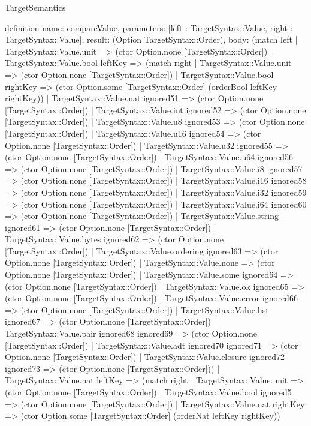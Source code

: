 \begin{lexlean}{TargetSemantics}
\begin{semanticmodule}
definition{
  name: compareValue,
  parameters: [left : TargetSyntax::Value, right : TargetSyntax::Value],
  result: (Option TargetSyntax::Order),
  body: (match left
    | TargetSyntax::Value.unit => (ctor Option.none [TargetSyntax::Order])
    | TargetSyntax::Value.bool leftKey => (match right
      | TargetSyntax::Value.unit => (ctor Option.none [TargetSyntax::Order])
      | TargetSyntax::Value.bool rightKey => (ctor Option.some [TargetSyntax::Order] (orderBool leftKey rightKey))
      | TargetSyntax::Value.nat ignored51 => (ctor Option.none [TargetSyntax::Order])
      | TargetSyntax::Value.int ignored52 => (ctor Option.none [TargetSyntax::Order])
      | TargetSyntax::Value.u8 ignored53 => (ctor Option.none [TargetSyntax::Order])
      | TargetSyntax::Value.u16 ignored54 => (ctor Option.none [TargetSyntax::Order])
      | TargetSyntax::Value.u32 ignored55 => (ctor Option.none [TargetSyntax::Order])
      | TargetSyntax::Value.u64 ignored56 => (ctor Option.none [TargetSyntax::Order])
      | TargetSyntax::Value.i8 ignored57 => (ctor Option.none [TargetSyntax::Order])
      | TargetSyntax::Value.i16 ignored58 => (ctor Option.none [TargetSyntax::Order])
      | TargetSyntax::Value.i32 ignored59 => (ctor Option.none [TargetSyntax::Order])
      | TargetSyntax::Value.i64 ignored60 => (ctor Option.none [TargetSyntax::Order])
      | TargetSyntax::Value.string ignored61 => (ctor Option.none [TargetSyntax::Order])
      | TargetSyntax::Value.bytes ignored62 => (ctor Option.none [TargetSyntax::Order])
      | TargetSyntax::Value.ordering ignored63 => (ctor Option.none [TargetSyntax::Order])
      | TargetSyntax::Value.none => (ctor Option.none [TargetSyntax::Order])
      | TargetSyntax::Value.some ignored64 => (ctor Option.none [TargetSyntax::Order])
      | TargetSyntax::Value.ok ignored65 => (ctor Option.none [TargetSyntax::Order])
      | TargetSyntax::Value.error ignored66 => (ctor Option.none [TargetSyntax::Order])
      | TargetSyntax::Value.list ignored67 => (ctor Option.none [TargetSyntax::Order])
      | TargetSyntax::Value.pair ignored68 ignored69 => (ctor Option.none [TargetSyntax::Order])
      | TargetSyntax::Value.adt ignored70 ignored71 => (ctor Option.none [TargetSyntax::Order])
      | TargetSyntax::Value.closure ignored72 ignored73 => (ctor Option.none [TargetSyntax::Order]))
    | TargetSyntax::Value.nat leftKey => (match right
      | TargetSyntax::Value.unit => (ctor Option.none [TargetSyntax::Order])
      | TargetSyntax::Value.bool ignored5 => (ctor Option.none [TargetSyntax::Order])
      | TargetSyntax::Value.nat rightKey => (ctor Option.some [TargetSyntax::Order] (orderNat leftKey rightKey))
}
\end{semanticmodule}
\end{lexlean}
